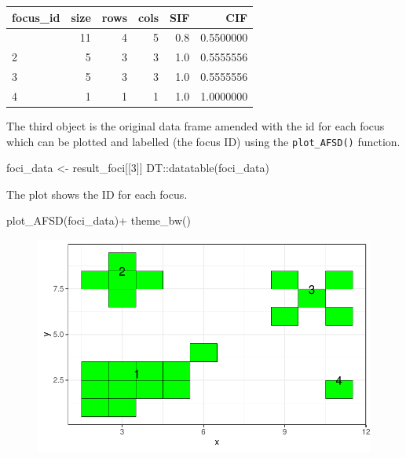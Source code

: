 \documentclass[
  letterpaper,
  DIV=11,
  numbers=noendperiod]{scrreprt}
\newenvironment{Shaded}{\begin{snugshade}}{\end{snugshade}}
\newcommand{\DecValTok}[1]{\textcolor[rgb]{0.68,0.00,0.00}{#1}}
\newcommand{\FunctionTok}[1]{\textcolor[rgb]{0.28,0.35,0.67}{#1}}
\newcommand{\NormalTok}[1]{\textcolor[rgb]{0.00,0.23,0.31}{#1}}
\newcommand{\OtherTok}[1]{\textcolor[rgb]{0.00,0.23,0.31}{#1}}
\newcommand{\SpecialCharTok}[1]{\textcolor[rgb]{0.37,0.37,0.37}{#1}}
\begin{document}
\begin{longtable}[]{@{}lrrrrr@{}}
\toprule\noalign{}
focus\_id & size & rows & cols & SIF & CIF \\
\midrule\noalign{}
\endhead
\bottomrule\noalign{}
\endlastfoot
1 & 11 & 4 & 5 & 0.8 & 0.5500000 \\
2 & 5 & 3 & 3 & 1.0 & 0.5555556 \\
3 & 5 & 3 & 3 & 1.0 & 0.5555556 \\
4 & 1 & 1 & 1 & 1.0 & 1.0000000 \\
\end{longtable}

The third object is the original data frame amended with the id for each
focus which can be plotted and labelled (the focus ID) using the
\texttt{plot\_AFSD()} function.

\begin{Shaded}
\begin{Highlighting}[]
\NormalTok{foci\_data }\OtherTok{\textless{}{-}}\NormalTok{ result\_foci[[}\DecValTok{3}\NormalTok{]]}
\NormalTok{DT}\SpecialCharTok{::}\FunctionTok{datatable}\NormalTok{(foci\_data)}
\end{Highlighting}
\end{Shaded}

The plot shows the ID for each focus.

\begin{Shaded}
\begin{Highlighting}[]
\FunctionTok{plot\_AFSD}\NormalTok{(foci\_data)}\SpecialCharTok{+}
  \FunctionTok{theme\_bw}\NormalTok{()}
\end{Highlighting}
\end{Shaded}

\begin{figure}[H]

{\centering \includegraphics{spatial-tests_files/figure-pdf/unnamed-chunk-13-1.pdf}

}

\end{figure}
\end{document}
